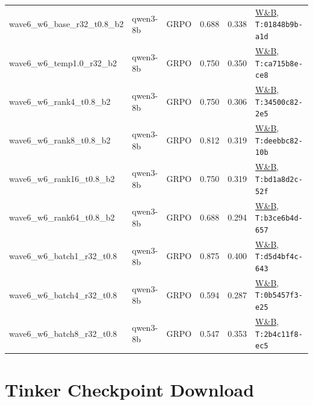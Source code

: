 \documentclass[12pt,a4paper]{report}
\theoremstyle{definition}
\begin{document}
{\begin{longtable}{p{3.5cm}p{2cm}p{1.2cm}rrp{3.5cm}}
wave6\_w6\_base\_r32\_t0.8\_b2 & qwen3-8b & GRPO & 0.688 & 0.338 & \href{https://wandb.ai/arvindcr4-pes-university/tinker-rl-lab-world-class/runs/01848b9b-a1df-5337-967f-72aa89574fca:train:0}{W\&B}, \texttt{T:01848b9b-a1d} \\
wave6\_w6\_temp1.0\_r32\_b2 & qwen3-8b & GRPO & 0.750 & 0.350 & \href{https://wandb.ai/arvindcr4-pes-university/tinker-rl-lab-world-class/runs/ca715b8e-ce87-5d1c-8ca5-652be62476cb:train:0}{W\&B}, \texttt{T:ca715b8e-ce8} \\
wave6\_w6\_rank4\_t0.8\_b2 & qwen3-8b & GRPO & 0.750 & 0.306 & \href{https://wandb.ai/arvindcr4-pes-university/tinker-rl-lab-world-class/runs/34500c82-2e58-502f-84aa-9d917ed59d83:train:0}{W\&B}, \texttt{T:34500c82-2e5} \\
wave6\_w6\_rank8\_t0.8\_b2 & qwen3-8b & GRPO & 0.812 & 0.319 & \href{https://wandb.ai/arvindcr4-pes-university/tinker-rl-lab-world-class/runs/deebbc82-10b8-57eb-bb0d-89d1895e592f:train:0}{W\&B}, \texttt{T:deebbc82-10b} \\
wave6\_w6\_rank16\_t0.8\_b2 & qwen3-8b & GRPO & 0.750 & 0.319 & \href{https://wandb.ai/arvindcr4-pes-university/tinker-rl-lab-world-class/runs/bd1a8d2c-52f8-52c1-b764-4ff045286650:train:0}{W\&B}, \texttt{T:bd1a8d2c-52f} \\
wave6\_w6\_rank64\_t0.8\_b2 & qwen3-8b & GRPO & 0.688 & 0.294 & \href{https://wandb.ai/arvindcr4-pes-university/tinker-rl-lab-world-class/runs/b3ce6b4d-6571-5f5f-9a70-fdc29b10e8bb:train:0}{W\&B}, \texttt{T:b3ce6b4d-657} \\
wave6\_w6\_batch1\_r32\_t0.8 & qwen3-8b & GRPO & 0.875 & 0.400 & \href{https://wandb.ai/arvindcr4-pes-university/tinker-rl-lab-world-class/runs/d5d4bf4c-6430-5083-a3a8-648c79dc00b5:train:0}{W\&B}, \texttt{T:d5d4bf4c-643} \\
wave6\_w6\_batch4\_r32\_t0.8 & qwen3-8b & GRPO & 0.594 & 0.287 & \href{https://wandb.ai/arvindcr4-pes-university/tinker-rl-lab-world-class/runs/0b5457f3-e254-5457-b859-50d264855b27:train:0}{W\&B}, \texttt{T:0b5457f3-e25} \\
wave6\_w6\_batch8\_r32\_t0.8 & qwen3-8b & GRPO & 0.547 & 0.353 & \href{https://wandb.ai/arvindcr4-pes-university/tinker-rl-lab-world-class/runs/2b4c11f8-ec55-5265-b6ba-0ec1850dc81b:train:0}{W\&B}, \texttt{T:2b4c11f8-ec5} \\
\bottomrule
\end{longtable}
}


\section{Tinker Checkpoint Download}
\end{document}
